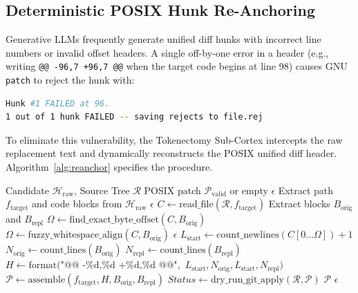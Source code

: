 \documentclass[10pt,twocolumn,letterpaper]{article}
\begin{document}
\subsection{Deterministic POSIX Hunk Re-Anchoring}
Generative LLMs frequently generate unified diff hunks with incorrect line numbers or invalid offset headers. A single off-by-one error in a header (e.g., writing \texttt{@@ -96,7 +96,7 @@} when the target code begins at line 98) causes GNU \texttt{patch} to reject the hunk with:
\begin{lstlisting}[language=bash]
Hunk #1 FAILED at 96.
1 out of 1 hunk FAILED -- saving rejects to file.rej
\end{lstlisting}

To eliminate this vulnerability, the Tokenectomy Sub-Cortex intercepts the raw replacement text and dynamically reconstructs the POSIX unified diff header. Algorithm~\ref{alg:reanchor} specifies the procedure.

\begin{algorithm}[t]
\caption{Deterministic POSIX Hunk Re-Anchoring}
\label{alg:reanchor}
\begin{algorithmic}[1]
\Require Candidate $\mathcal{H}_{\text{raw}}$, Source Tree $\mathcal{R}$
\Ensure POSIX patch $\mathcal{P}_{\text{valid}}$ or empty $\epsilon$
\State Extract path $f_{\text{target}}$ and code blocks from $\mathcal{H}_{\text{raw}}$
    \State \Return $\epsilon$ 
\EndIf
\State $C \leftarrow \text{read\_file}(\mathcal{R}, f_{\text{target}})$
\State Extract blocks $B_{\text{orig}}$ and $B_{\text{repl}}$
\State $\Omega \leftarrow \text{find\_exact\_byte\_offset}(C, B_{\text{orig}})$
    \State $\Omega \leftarrow \text{fuzzy\_whitespace\_align}(C, B_{\text{orig}})$
        \State \Return $\epsilon$ 
    \EndIf
\EndIf
\State $L_{\text{start}} \leftarrow \text{count\_newlines}(C[0 \dots \Omega]) + 1$
\State $N_{\text{orig}} \leftarrow \text{count\_lines}(B_{\text{orig}})$
\State $N_{\text{repl}} \leftarrow \text{count\_lines}(B_{\text{repl}})$
\State $H \leftarrow \text{format}(\text{"@@ -\%d,\%d +\%d,\%d @@"},$
\State \qquad \quad $L_{\text{start}}, N_{\text{orig}}, L_{\text{start}}, N_{\text{repl}})$
\State $\mathcal{P} \leftarrow \text{assemble}(f_{\text{target}}, H, B_{\text{orig}}, B_{\text{repl}})$
\State $Status \leftarrow \text{dry\_run\_git\_apply}(\mathcal{R}, \mathcal{P})$
    \State \Return $\mathcal{P}$
\Else
    \State \Return $\epsilon$ 
\EndIf
\end{algorithmic}
\end{algorithm}
\end{document}
